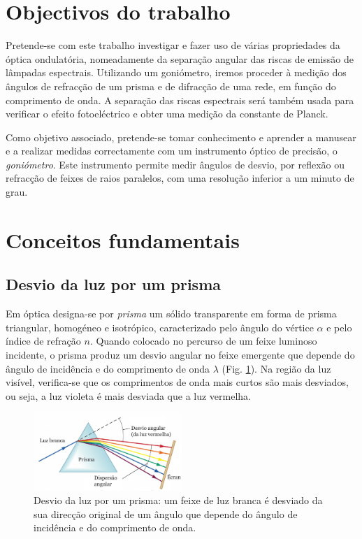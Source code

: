 \documentclass[a4paper,twoside,11pt]{report}      %
\begin{document}
\section{\sf Objectivos do trabalho}
Pretende-se com este trabalho investigar e fazer uso de várias propriedades da óptica ondulatória, nomeadamente da separação angular das riscas de emissão de lâmpadas espectrais. Utilizando um goniómetro, iremos proceder à medição dos ângulos de refracção de um prisma e de difracção de uma rede, em função do comprimento de onda. A separação das riscas espectrais será também usada para verificar o efeito fotoeléctrico e obter uma medição da constante de Planck.

Como objetivo associado, pretende-se tomar conhecimento e aprender a manusear e a realizar medidas correctamente  com um instrumento óptico de precisão, o \emph{goniómetro}. Este instrumento permite medir ângulos de desvio, por reflexão ou refracção de feixes de raios paralelos, com uma resolução inferior a um minuto de grau.

\section{\sf Conceitos fundamentais}
\subsection{\sf Desvio da luz por um prisma}
Em óptica designa-se por \emph{prisma} um sólido transparente em forma de prisma triangular, homogéneo e isotrópico, caracterizado pelo ângulo do vértice $\alpha$ e pelo índice de refração $n$. Quando colocado no percurso de um feixe luminoso incidente, o prisma produz um desvio angular no feixe emergente que depende do ângulo de incidência e do comprimento de onda $\lambda$ (Fig. \ref{fig:prisma1}). Na região da luz visível, verifica-se que os comprimentos de onda mais curtos são mais desviados, ou seja, a luz violeta é mais desviada que a luz vermelha.

\begin{figure}[htb]  \centering 
	\includegraphics[width=0.5\textwidth]{prisma1.pdf}
	\caption{Desvio da luz por um prisma: um feixe de luz branca é desviado da sua direcção original de um ângulo que depende do ângulo de incidência e do comprimento de onda. \label{fig:prisma1}} 
\end{figure}
\end{document}

